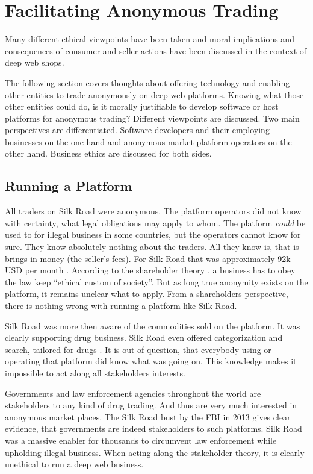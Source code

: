 \section{Facilitating Anonymous Trading}
\label{tech}

Many different ethical viewpoints have been taken and moral implications and consequences of consumer and seller actions have been discussed in the context of deep web shops.

The following section covers thoughts about offering technology and enabling other entities to trade anonymously on deep web platforms. Knowing what those other entities could do, is it morally justifiable to develop software or host platforms for anonymous trading? Different viewpoints are discussed. Two main perspectives are differentiated. Software developers and their employing businesses on the one hand and anonymous market platform operators on the other hand. Business ethics are discussed for both sides.

\subsection{Running a Platform}

All traders on Silk Road were anonymous. The platform operators did not know with certainty, what legal obligations may apply to whom. The platform \emph{could} be used to for illegal business in some countries, but the operators cannot know for sure. They know absolutely nothing about the traders. All they know is, that is brings in money (the seller's fees). For Silk Road that was approximately 92k USD per month \cite{silkroad2013}. According to the shareholder theory \cite{shareholder}, a business has to obey the law keep ``ethical custom of society''. But as long true anonymity exists on the platform, it remains unclear what to apply. From a shareholders perspective, there is nothing wrong with running a platform like Silk Road.

Silk Road was more then aware of the commodities sold on the platform. It was clearly supporting drug business. Silk Road even offered categorization and search, tailored for drugs \cite{silkroad2013}. It is out of question, that everybody using or operating that platform did know what was going on. This knowledge makes it impossible to act along all stakeholders interests.

Governments and law enforcement agencies throughout the world are stakeholders to any kind of drug trading. And thus are very much interested in anonymous market places. The Silk Road bust by the FBI in 2013 gives clear evidence, that governments are indeed stakeholders to such platforms. Silk Road was a massive enabler for thousands to circumvent law enforcement while upholding illegal business. When acting along the stakeholder theory, it is clearly unethical to run a deep web business.

